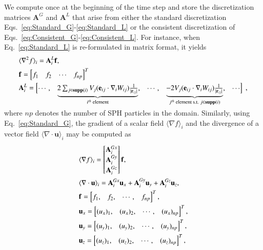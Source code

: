 \documentclass[final,3p,times]{elsarticle}
\begin{document}
We compute once at the beginning of the time step and store the discretization matrices $\mathbf{A}^G$ and $\mathbf{A}^L$ that arise from either the standard discretization Eqs.~\eqref{eq:Standard_G}-\eqref{eq:Standard_L} or the consistent discretization of  Eqs.~\eqref{eq:Consistent_G}-\eqref{eq:Consistent_L}. For instance, when Eq.~\eqref{eq:Standard_L} is re-formulated in matrix format, it yields
 \begin{align}\renewcommand{\arraystretch}{1.2}
 &\langle \nabla^2 f \rangle_i=\mathbf{A}^L_i \mathbf{f},\\
 &\mathbf{f}= \begin{bmatrix}
 f_1&f_2&\cdots&f_{np}
 \end{bmatrix}^T\\
 &\mathbf{A}^L_i= \begin{bmatrix}
\cdots, & 
 \smash[b]{\underbrace{\begin{matrix}2\sum_{j \in \support{i}} V_j ( \mathbf{e}_{ij} \cdot \nabla_i W_{ij}) \frac{1}{|\mathbf{r}_{ij}|} \end{matrix}}_{i^{th}\text{ element} }},
 &\cdots, &\smash[b]{\underbrace{\begin{matrix}-2 V_j ( \mathbf{e}_{ij} \cdot \nabla_i W_{ij}) \frac{1}{|\mathbf{r}_{ij}|}\end{matrix}}_{j^{th}\text{ element s.t. }{j \in \support{i}} }}, & \cdots
\end{bmatrix} \; ,
\end{align}
\\
where ${np}$ denotes the number of SPH particles in the domain. Similarly, using Eq.~\eqref{eq:Standard_G}, the gradient of a scalar field $\langle \nabla f \rangle_i$ and the divergence of a vector field $\langle \nabla \cdot \mathbf{u} \rangle_i$ may be computed as 
 \begin{align}\renewcommand{\arraystretch}{1.2}
&\langle \nabla f \rangle_i=
\begin{bmatrix} 
\mathbf{A}^{Gx}_i\\
\mathbf{A}^{Gy}_i\\
\mathbf{A}^{Gz}_i\\
\end{bmatrix}\mathbf{f}, \\ 
&\langle \nabla \cdot \mathbf{u} \rangle_i=
\mathbf{A}^{Gx}_i \mathbf{u}_x+
\mathbf{A}^{Gy}_i \mathbf{u}_y+
\mathbf{A}^{Gz}_i \mathbf{u}_z, \label{eq:divergence_disc}\\
&\mathbf{f}= \begin{bmatrix}
f_1,&f_2,&\cdots,&f_{np}
\end{bmatrix}^T, \\
&\mathbf{u}_x= \begin{bmatrix}
(u_x)_{1},&(u_x)_{2},&\cdots,&(u_x)_{np}
\end{bmatrix}^T,\\
&\mathbf{u}_y= \begin{bmatrix}
(u_y)_{1},&(u_y)_{2},&\cdots,&(u_y)_{np}
\end{bmatrix}^T,\\
&\mathbf{u}_z= \begin{bmatrix}
(u_z)_{1}, & (u_z)_{2},&\cdots,& (u_z)_{np}
\end{bmatrix}^T, \label{eq:uxuyuz}
\end{align}
\end{document}
